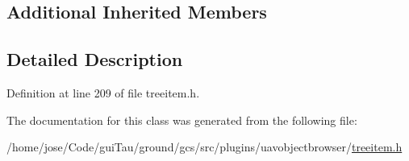 \subsection*{Additional Inherited Members}


\subsection{Detailed Description}


Definition at line 209 of file treeitem.\-h.



The documentation for this class was generated from the following file\-:\begin{DoxyCompactItemize}
\item 
/home/jose/\-Code/gui\-Tau/ground/gcs/src/plugins/uavobjectbrowser/\hyperlink{treeitem_8h}{treeitem.\-h}\end{DoxyCompactItemize}
